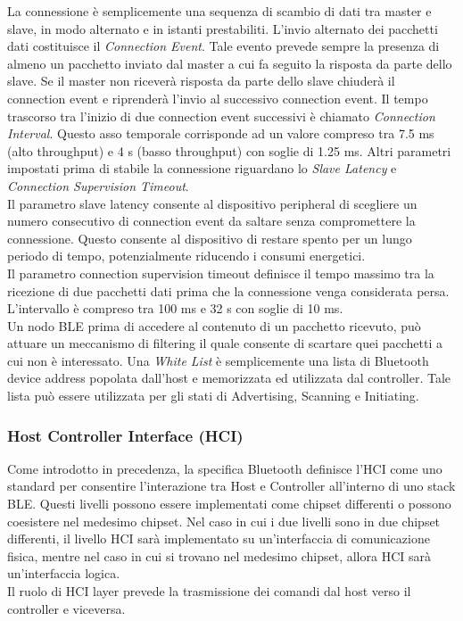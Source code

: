 \noindent La connessione è semplicemente una sequenza di scambio di dati tra master e slave, in modo alternato e in istanti prestabiliti. L'invio alternato dei pacchetti dati costituisce il \textit{Connection Event}. Tale evento prevede sempre la presenza di almeno un pacchetto inviato dal master a cui fa seguito la risposta da parte dello slave. Se il master non riceverà risposta da parte dello slave chiuderà il connection event e riprenderà l'invio al successivo connection event. Il tempo trascorso tra l'inizio di due connection event successivi è chiamato \textit{Connection Interval}. Questo asso temporale corrisponde ad un valore compreso tra 7.5 ms (alto throughput) e 4 s (basso throughput) con soglie di 1.25 ms. Altri parametri impostati prima di stabile la connessione riguardano lo \textit{Slave Latency} e \textit{Connection Supervision Timeout}.\\
Il parametro slave latency consente al dispositivo peripheral di scegliere un numero consecutivo di connection event da saltare senza compromettere la connessione. Questo consente al dispositivo di restare spento per un lungo periodo di tempo, potenzialmente riducendo i consumi energetici.\\
Il parametro connection supervision timeout definisce il tempo massimo tra la ricezione di due pacchetti dati prima che la connessione venga considerata persa. L'intervallo è compreso tra 100 ms e 32 s con soglie di 10 ms.\\

\noindent Un nodo BLE prima di accedere al contenuto di un pacchetto ricevuto, può attuare un meccanismo di filtering il quale consente di scartare quei pacchetti a cui non è interessato. Una \textit{White List} è semplicemente una lista di Bluetooth device address popolata dall'host e memorizzata ed utilizzata dal controller. Tale lista può essere utilizzata per gli stati di Advertising, Scanning e Initiating.


\subsubsection{Host Controller Interface (HCI)}
Come introdotto in precedenza, la specifica Bluetooth definisce l'HCI come uno standard per consentire l'interazione tra Host e Controller all'interno di uno stack BLE. Questi livelli possono essere implementati come chipset differenti o possono coesistere nel medesimo chipset. Nel caso in cui i due livelli sono in due chipset differenti, il livello HCI sarà implementato su un'interfaccia di comunicazione fisica, mentre nel caso in cui si trovano nel medesimo chipset, allora HCI sarà un'interfaccia logica.\\
Il ruolo di HCI layer prevede la trasmissione dei comandi dal host verso il controller e viceversa.

